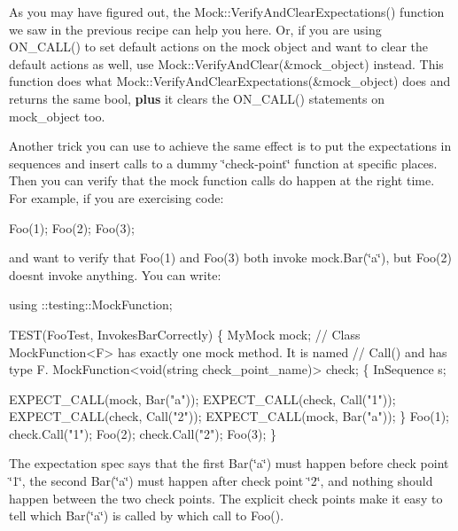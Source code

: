 As you may have figured out, the {\ttfamily Mock\+::\+Verify\+And\+Clear\+Expectations()} function we saw in the previous recipe can help you here. Or, if you are using {\ttfamily O\+N\+\_\+\+C\+A\+L\+L()} to set default actions on the mock object and want to clear the default actions as well, use {\ttfamily Mock\+::\+Verify\+And\+Clear(\&mock\+\_\+object)} instead. This function does what {\ttfamily Mock\+::\+Verify\+And\+Clear\+Expectations(\&mock\+\_\+object)} does and returns the same {\ttfamily bool}, {\bfseries plus} it clears the {\ttfamily O\+N\+\_\+\+C\+A\+L\+L()} statements on {\ttfamily mock\+\_\+object} too.

Another trick you can use to achieve the same effect is to put the expectations in sequences and insert calls to a dummy \char`\"{}check-\/point\char`\"{} function at specific places. Then you can verify that the mock function calls do happen at the right time. For example, if you are exercising code\+:


\begin{DoxyCode}
Foo(1);
Foo(2);
Foo(3);
\end{DoxyCode}


and want to verify that {\ttfamily Foo(1)} and {\ttfamily Foo(3)} both invoke {\ttfamily mock.\+Bar(\char`\"{}a\char`\"{})}, but {\ttfamily Foo(2)} doesn\textquotesingle{}t invoke anything. You can write\+:


\begin{DoxyCode}
using ::testing::MockFunction;

TEST(FooTest, InvokesBarCorrectly) \{
  MyMock mock;
  // Class MockFunction<F> has exactly one mock method.  It is named
  // Call() and has type F.
  MockFunction<void(string check\_point\_name)> check;
  \{
    InSequence s;

    EXPECT\_CALL(mock, Bar("a"));
    EXPECT\_CALL(check, Call("1"));
    EXPECT\_CALL(check, Call("2"));
    EXPECT\_CALL(mock, Bar("a"));
  \}
  Foo(1);
  check.Call("1");
  Foo(2);
  check.Call("2");
  Foo(3);
\}
\end{DoxyCode}


The expectation spec says that the first {\ttfamily Bar(\char`\"{}a\char`\"{})} must happen before check point \char`\"{}1\char`\"{}, the second {\ttfamily Bar(\char`\"{}a\char`\"{})} must happen after check point \char`\"{}2\char`\"{}, and nothing should happen between the two check points. The explicit check points make it easy to tell which {\ttfamily Bar(\char`\"{}a\char`\"{})} is called by which call to {\ttfamily Foo()}.


